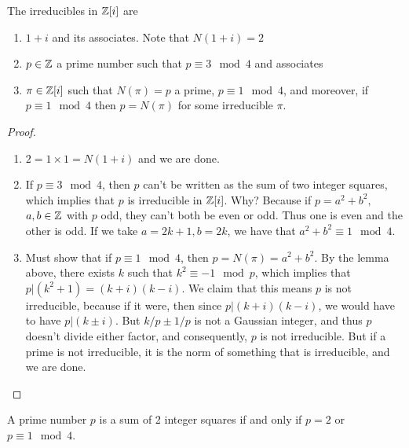 \documentclass{../mathnotes}
\begin{document}
\begin{thm}
    The irreducibles in $\mathbb{Z}[i]$ are
    \begin{enumerate}
        \item $1+i$ and its associates. Note that $N(1+i)=2$
        \item $p\in\mathbb{Z}$ a prime number such that $p\equiv3\mod 4$ and associates
        \item $\pi\in\mathbb{Z}[i]$ such that $N(\pi)=p$ a prime, $p\equiv 1\mod 4$, and moreover, if $p\equiv 1\mod 4$
            then $p=N(\pi)$ for some irreducible $\pi$.
    \end{enumerate}
\end{thm}
\begin{proof}
    \begin{enumerate}
        \item $2=1\times 1=N(1+i)$ and we are done.
        \item If $p\equiv 3\mod 4$, then $p$ can't be written as the sum of two integer squares, which implies that
            $p$ is irreducible in $\mathbb{Z}[i]$. Why? Because if $p=a^2+b^2,$ $a,b\in\mathbb{Z}$ with $p$ odd, they can't both be even
            or odd. Thus one is even and the other is odd. If we take $a=2k+1,b=2k$, we have that $a^2+b^2\equiv 1\mod 4$.
        \item Must show that if $p\equiv1\mod 4$, then $p=N(\pi)=a^2+b^2$. By the lemma above, there exists $k$ such that
            $k^2\equiv -1\mod p$, which implies that $p|(k^2+1)=(k+i)(k-i)$. We claim that this means $p$ is not irreducible, because
            if it were, then since $p|(k+i)(k-i)$, we would have to have $p|(k\pm i)$. But $k/p\pm1/p$ is not a Gaussian integer,
            and thus $p$ doesn't divide either factor, and consequently, $p$ is not irreducible. But if a prime is not irreducible,
            it is the norm of something that is irreducible, and we are done.
    \end{enumerate}
\end{proof}

\begin{cor}
    A prime number $p$ is a sum of 2 integer squares if and only if $p=2$ or $p\equiv 1\mod 4$.
\end{cor}
\end{document}
